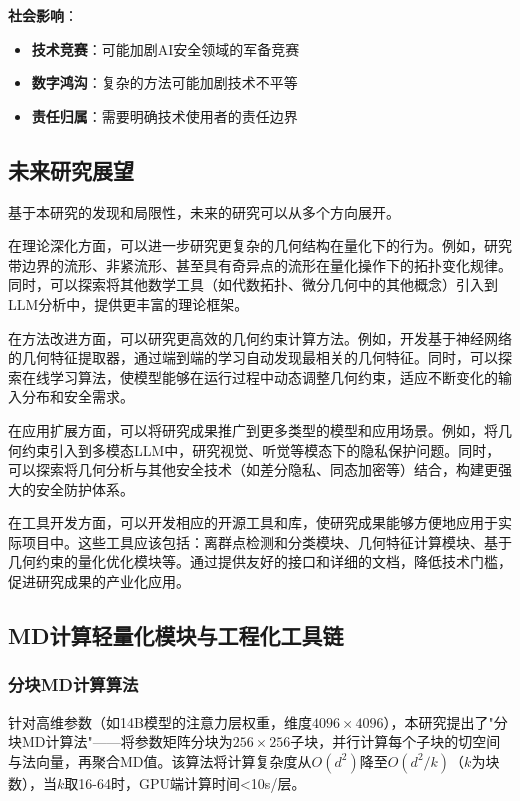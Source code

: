 \textbf{社会影响}：
\begin{itemize}
\item \textbf{技术竞赛}：可能加剧AI安全领域的军备竞赛
\item \textbf{数字鸿沟}：复杂的方法可能加剧技术不平等
\item \textbf{责任归属}：需要明确技术使用者的责任边界
\end{itemize}

\subsection{未来研究展望}

基于本研究的发现和局限性，未来的研究可以从多个方向展开。

在理论深化方面，可以进一步研究更复杂的几何结构在量化下的行为。例如，研究带边界的流形、非紧流形、甚至具有奇异点的流形在量化操作下的拓扑变化规律。同时，可以探索将其他数学工具（如代数拓扑、微分几何中的其他概念）引入到LLM分析中，提供更丰富的理论框架。

在方法改进方面，可以研究更高效的几何约束计算方法。例如，开发基于神经网络的几何特征提取器，通过端到端的学习自动发现最相关的几何特征。同时，可以探索在线学习算法，使模型能够在运行过程中动态调整几何约束，适应不断变化的输入分布和安全需求。

在应用扩展方面，可以将研究成果推广到更多类型的模型和应用场景。例如，将几何约束引入到多模态LLM中，研究视觉、听觉等模态下的隐私保护问题。同时，可以探索将几何分析与其他安全技术（如差分隐私、同态加密等）结合，构建更强大的安全防护体系。

在工具开发方面，可以开发相应的开源工具和库，使研究成果能够方便地应用于实际项目中。这些工具应该包括：离群点检测和分类模块、几何特征计算模块、基于几何约束的量化优化模块等。通过提供友好的接口和详细的文档，降低技术门槛，促进研究成果的产业化应用。

\subsection{MD计算轻量化模块与工程化工具链}

\subsubsection{分块MD计算算法}

针对高维参数（如14B模型的注意力层权重，维度$4096 \times 4096$），本研究提出了"分块MD计算法"——将参数矩阵分块为$256 \times 256$子块，并行计算每个子块的切空间与法向量，再聚合MD值。该算法将计算复杂度从$O(d^2)$降至$O(d^2/k)$（$k$为块数），当$k$取16-64时，GPU端计算时间<10s/层。

